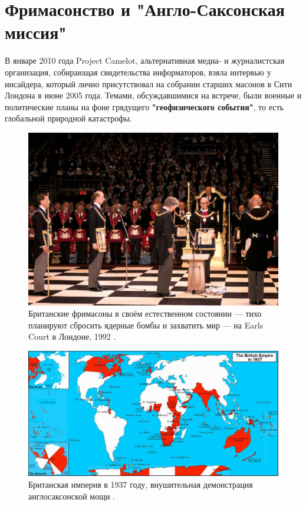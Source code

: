 \documentclass[10pt,twocolumn,letterpaper]{article}
\begin{document}
\section{Фримасонство и "Англо-Саксонская миссия"}

В январе 2010 года Project Camelot, альтернативная медиа- и журналистская организация, собирающая свидетельства информаторов, взяла интервью \cite{4,6} у инсайдера, который лично присутствовал на собрании старших масонов в Сити Лондона в июне 2005 года. Темами, обсуждавшимися на встрече, были военные и политические планы на фоне грядущего \textbf{"геофизического события"}, то есть глобальной природной катастрофы.

\begin{figure}[b]
\begin{center}
   \includegraphics[width=1\linewidth]{freemason.jpg}
\end{center}
   \caption{Британские фримасоны в своём естественном состоянии — тихо планируют сбросить ядерные бомбы и захватить мир — на Earls Court в Лондоне, 1992 \cite{5}.}
\label{fig:1}
\label{fig:onecol}
\end{figure}

\begin{figure}[t]
\begin{center}
\includegraphics[width=1\textwidth]{british.jpg}
\end{center}

   \caption{Британская империя в 1937 году, внушительная демонстрация англосаксонской мощи \cite{14}.}
   \label{fig:2}
\end{figure}
\end{document}
